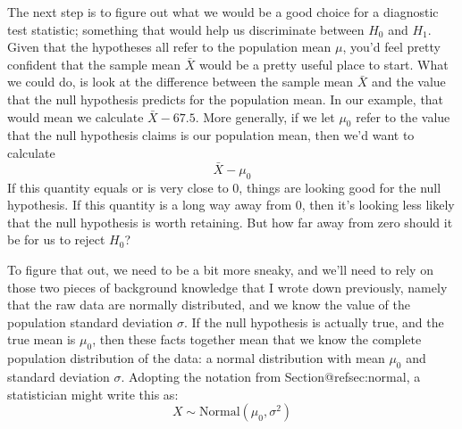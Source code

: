 The next step is to figure out what we would be a good choice for a diagnostic test statistic; something that would help us discriminate between $H_0$ and $H_1$. Given that the hypotheses all refer to the population mean $\mu$, you'd feel pretty confident that the sample mean $\bar{X}$ would be a pretty useful place to start. What we could do, is look at the difference between the sample mean $\bar{X}$ and the value that the null hypothesis predicts for the population mean. In our example, that would mean we calculate $\bar{X} - 67.5$. More generally, if we let $\mu_0$ refer to the value that the null hypothesis claims is our population mean, then we'd want to calculate
$$
\bar{X} - \mu_0
$$
If this quantity equals or is very close to 0, things are looking good for the null hypothesis. If this quantity is a long way away from 0, then it's looking less likely that the null hypothesis is worth retaining. But how far away from zero should it be for us to reject $H_0$? 

To figure that out, we need to be a bit more sneaky, and we'll need to rely on those two pieces of background knowledge that I wrote down previously, namely that the raw data are normally distributed, and we know the value of the population standard deviation $\sigma$. If the null hypothesis is actually true, and the true mean is $\mu_0$, then these facts together mean that we know the complete population distribution of the data: a normal distribution with mean $\mu_0$ and standard deviation $\sigma$. Adopting the notation from Section@refsec:normal, a statistician might write this as:
$$
X \sim \mbox{Normal}(\mu_0,\sigma^2)
$$



